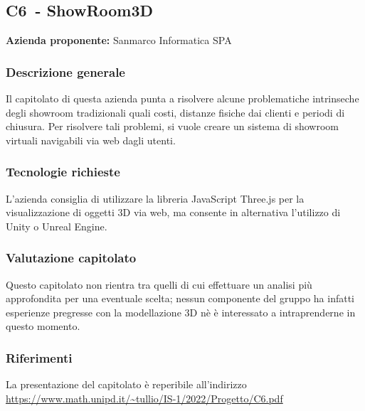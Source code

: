 
\renewcommand{\capName}{ShowRoom3D} %
\renewcommand{\capCode}{C6} %
\renewcommand{\capLink}{https://www.math.unipd.it/~tullio/IS-1/2022/Progetto/C6.pdf} %
\renewcommand{\capProposer}{SanMarco Informatica} %


\subsection{\capCode\ - \capName}
\textbf{Azienda proponente:} Sanmarco Informatica SPA
\subsubsection{Descrizione generale}
Il capitolato di questa azienda punta a risolvere alcune problematiche intrinseche degli showroom tradizionali quali costi, distanze fisiche dai clienti e periodi di chiusura. Per risolvere tali problemi, si vuole creare un sistema di showroom virtuali navigabili via web dagli utenti.

\subsubsection{Tecnologie richieste}
L'azienda consiglia di utilizzare la libreria JavaScript Three.js per la visualizzazione di oggetti 3D via web, ma consente in alternativa l'utilizzo di Unity o Unreal Engine.

\subsubsection{Valutazione capitolato}
Questo capitolato non rientra tra quelli di cui effettuare un analisi più approfondita per una eventuale scelta; nessun componente del gruppo ha infatti esperienze pregresse con la modellazione 3D nè è interessato a intraprenderne in questo momento.

\subsubsection{Riferimenti}
La presentazione del capitolato è reperibile all'indirizzo \url{\capLink}